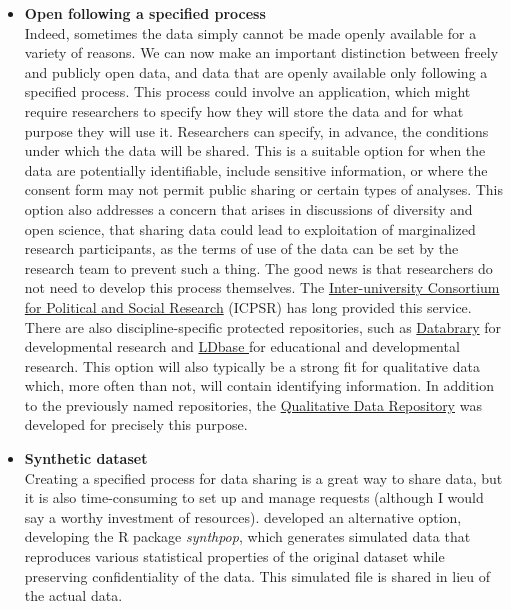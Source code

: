 \documentclass[authordate, empirical]{jote-new-article}
\begin{document}
\begin{itemize}
  \item \textbf{Open following a specified process}\\
        Indeed, sometimes the data simply cannot be made openly available for a variety of reasons. We can now make an important distinction between freely and publicly open data, and data that are openly available only following a specified process. This process could involve an application, which might require researchers to specify how they will store the data and for what purpose they will use it. Researchers can specify, in advance, the conditions under which the data will be shared. This is a suitable option for when the data are potentially identifiable, include sensitive information, or where the consent form may not permit public sharing or certain types of analyses. This option also addresses a concern that arises in discussions of diversity and open science, that sharing data could lead to exploitation of marginalized research participants, as the terms of use of the data can be set by the research team to prevent such a thing. The good news is that researchers do not need to develop this process themselves. The \href{https://www.icpsr.umich.edu/web/pages/}{Inter-university Consortium for Political and Social Research} (ICPSR) has long provided this service. There are also discipline-specific protected repositories, such as \href{https://nyu.databrary.org/}{Databrary} \parencites{Gilmore2016} for developmental research and \href{https://ldbase.org/}{LDbase }\parencites{Hart2020} for educational and developmental research. This option will also typically be a strong fit for qualitative data which, more often than not, will contain identifying information. In addition to the previously named repositories, the \href{https://qdr.syr.edu/}{Qualitative Data Repository} was developed for precisely this purpose.







  \item \textbf{Synthetic dataset}
        \\ Creating a specified process for data sharing is a great way to share data, but it is also time-consuming to set up and manage requests (although I would say a worthy investment of resources). \textcite{Quintana2020} developed an alternative option, developing the R package \emph{synthpop}, which generates simulated data that reproduces various statistical properties of the original dataset while preserving confidentiality of the data. This simulated file is shared in lieu of the actual data.








\end{itemize}
\end{document}
